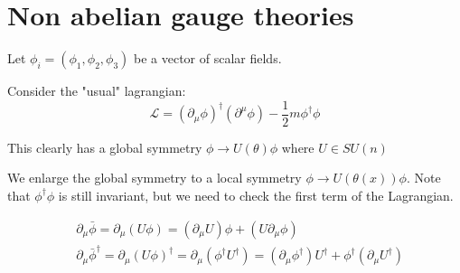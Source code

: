 \newcommand{\Lag}{\mathcal{L}}
\chapter{Non abelian gauge theories}

Let $\phi_i = (\phi_1, \phi_2, \phi_3)$ be a vector of scalar fields.

Consider the "usual" lagrangian:
$$\Lag = (\partial_\mu \phi)^\dagger (\partial^\mu \phi) - \frac{1}{2}m \phi^\dagger \phi$$

This clearly has a global symmetry $\phi \to U(\theta) \phi$ where $U \in SU(n)$

We enlarge the global symmetry to a local symmetry $\phi \to U(\theta(x)) \phi$.
Note that $\phi^\dagger \phi$ is still invariant, but we need to check
the first term of the Lagrangian.

\begin{align*}
    &\partial_\mu \bar \phi = \partial_\mu (U \phi) = (\partial_\mu U) \phi + (U \partial_\mu \phi) \\
    &\partial_\mu {\bar \phi}^\dagger = \partial_\mu (U \phi)^\dagger =  \partial_\mu (\phi^\dagger U^\dagger) = 
    (\partial_\mu \phi^\dagger) U^\dagger + \phi^\dagger (\partial_\mu U^\dagger)
\end{align*}


